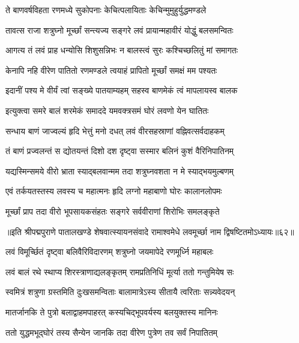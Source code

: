 \twolineshloka
{ते बाणवर्षविहता रणमध्ये सुकोपनाः}
{केचित्पलायिताः केचिन्मुमुहुर्युद्धमण्डले}%

\twolineshloka
{तावत्स राजा शत्रुघ्नो मूर्च्छां सन्त्यज्य सङ्गरे}
{लवं प्रायान्महावीरं योद्धुं बलसमन्वितः}%

\twolineshloka
{आगत्य तं लवं प्राह धन्योसि शिशुसन्निभः}
{न बालस्त्वं सुरः कश्चिच्छलितुं मां समागतः}%

\twolineshloka
{केनापि नहि वीरेण पातितो रणमण्डले}
{त्वयाहं प्रापितो मूर्च्छां समक्षं मम पश्यतः}%

\twolineshloka
{इदानीं पश्य मे वीर्यं त्वां सङ्ख्ये पातयाम्यहम्}
{सहस्व बाणमेकं त्वं मापलायस्व बालक}%

\twolineshloka
{इत्युक्त्वा समरे बालं शरमेकं समाददे}
{यमवक्त्रसमं घोरं लवणो येन घातितः}%

\twolineshloka
{सन्धाय बाणं जाज्वल्यं हृदि भेत्तुं मनो दधत्}
{लवं वीरसहस्राणां वह्निवत्सर्वदाहकम्}%

\twolineshloka
{तं बाणं प्रज्वलन्तं स द्योतयन्तं दिशो दश}
{दृष्ट्वा सस्मार बलिनं कुशं वैरिनिपातिनम्}%

\twolineshloka
{यद्यस्मिन्समये वीरो भ्राता स्याद्बलवान्मम}
{तदा शत्रुघ्नवशता न मे स्याद्भयमुल्बणम्}%

\twolineshloka
{एवं तर्कयतस्तस्य लवस्य च महात्मनः}
{हृदि लग्नो महाबाणो घोरः कालानलोपमः}%

\twolineshloka
{मूर्च्छां प्राप तदा वीरो भूपसायकसंहतः}
{सङ्गरे सर्ववीराणां शिरोभिः समलङ्कृते}%

{॥इति श्रीपद्मपुराणे पातालखण्डे शेषवात्स्यायनसंवादे रामाश्वमेधे लवमूर्च्छा नाम द्विषष्टितमोऽध्यायः॥६२॥}



\twolineshloka
{लवं विमूर्च्छितं दृष्ट्वा बलिवैरिविदारणम्}
{शत्रुघ्नो जयमापेदे रणमूर्ध्नि महाबलः}%

\twolineshloka
{लवं बालं रथे स्थाप्य शिरस्त्राणाद्यलङ्कृतम्}
{रामप्रतिनिधिं मूर्त्या ततो गन्तुमियेष सः}%

\twolineshloka
{स्वमित्रं शत्रुणा ग्रस्तमिति दुःखसमन्विताः}
{बालामात्रेऽस्य सीतायै त्वरिताः सन्न्यवेदयन्}%


\twolineshloka
{मातर्जानकि ते पुत्रो बलाद्वाहमपाहरत्}
{कस्यचिद्भूपवर्यस्य बलयुक्तस्य मानिनः}%

\twolineshloka
{ततो युद्धमभूद्घोरं तस्य सैन्येन जानकि}
{तदा वीरेण पुत्रेण तव सर्वं निपातितम्}%

